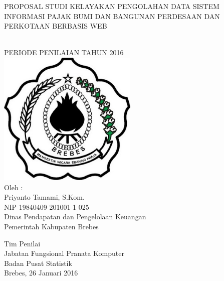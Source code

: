 \begin{titlepage}

\begin{center}
{\large PROPOSAL STUDI KELAYAKAN PENGOLAHAN DATA SISTEM INFORMASI PAJAK BUMI DAN BANGUNAN PERDESAAN DAN PERKOTAAN BERBASIS WEB}

\HRule\\[1cm]

PERIODE PENILAIAN TAHUN 2016\\[1cm]

\includegraphics[width=0.5\textwidth]{./resources/logo}\\[1cm]

Oleh :\\
Priyanto Tamami, S.Kom.\\
NIP 19840409 201001 1 025\\
Dinas Pendapatan dan Pengelolaan Keuangan\\
Pemerintah Kabupaten Brebes\\[1cm]

\vfill

Tim Penilai\\
Jabatan Fungsional Pranata Komputer\\
Badan Pusat Statistik\\
Brebes, 26 Januari 2016
\end{center}

\end{titlepage}